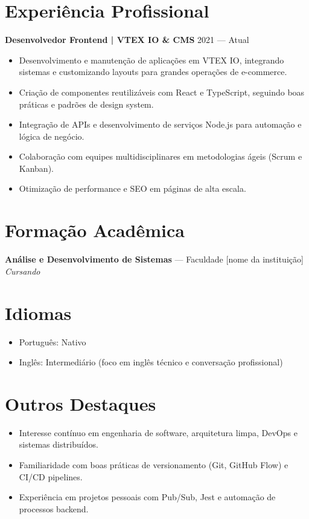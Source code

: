 \documentclass[a4paper,10pt]{article}
\begin{document}
\section*{Experiência Profissional}

\textbf{Desenvolvedor Frontend | VTEX IO \& CMS} \hfill 2021 — Atual\\[-4pt]
\begin{itemize}[leftmargin=1.2em, noitemsep, topsep=3pt]
    \item Desenvolvimento e manutenção de aplicações em VTEX IO, integrando sistemas e customizando layouts para grandes operações de e-commerce.
    \item Criação de componentes reutilizáveis com React e TypeScript, seguindo boas práticas e padrões de design system.
    \item Integração de APIs e desenvolvimento de serviços Node.js para automação e lógica de negócio.
    \item Colaboração com equipes multidisciplinares em metodologias ágeis (Scrum e Kanban).
    \item Otimização de performance e SEO em páginas de alta escala.
\end{itemize}

\section*{Formação Acadêmica}
\textbf{Análise e Desenvolvimento de Sistemas} — Faculdade [nome da instituição] \hfill \textit{Cursando}

\section*{Idiomas}
\begin{itemize}[leftmargin=1.2em, noitemsep, topsep=3pt]
    \item Português: Nativo
    \item Inglês: Intermediário (foco em inglês técnico e conversação profissional)
\end{itemize}

\section*{Outros Destaques}
\begin{itemize}[leftmargin=1.2em, noitemsep, topsep=3pt]
    \item Interesse contínuo em engenharia de software, arquitetura limpa, DevOps e sistemas distribuídos.
    \item Familiaridade com boas práticas de versionamento (Git, GitHub Flow) e CI/CD pipelines.
    \item Experiência em projetos pessoais com Pub/Sub, Jest e automação de processos backend.
\end{itemize}
\end{document}
